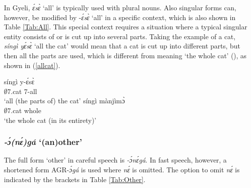 In Gyeli, {\itshape ɛ́sɛ̀} `all' is typically used with plural nouns.  Also singular forms can, however, be modified by -{\itshape ɛ́sɛ̀} `all'  in a specific context, which is also shown in Table \ref{Tab:All}. This special context requires a situation where a typical singular entity consists of or is cut up into several parts. Taking the example of a cat, {\itshape síngì yɛ́sɛ̀} `all the cat' would mean that a cat is cut up into different parts, but then all the parts are used, which is different from meaning `the whole cat' (), as shown in (\ref{allcat}).

\begin{exe}
\ex\label{allcat}
\begin{xlist}
\ex\label{allcat1}
 \gll  síngì y-ɛ́sɛ̀  \\
          $\emptyset$7.cat 7-all  \\
    \trans `all (the parts of) the cat'
\ex \label{allcat2}
  \gll    síngì mànjìmɔ̀ \\
              $\emptyset$7.cat whole \\
    \trans `the whole cat (in its entirety)'
\end {xlist}
\end {exe}
















\subsubsection{{\itshape -ɔ́(nɛ́)gá} `(an)other'}
\label{sec:other}

The full form `other' in careful speech is {\itshape -ɔ́nɛ́gá}. 
In fast speech, however, a shortened form AGR-{\itshape ɔ́gá} is used where {\itshape nɛ́} is omitted. The option to omit {\itshape nɛ́} is indicated by the brackets in Table \ref{Tab:Other}. 

